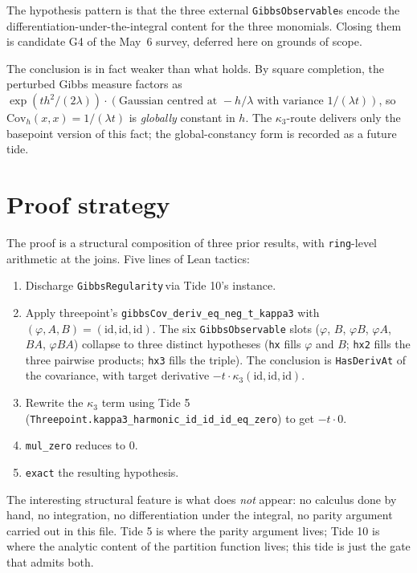 \documentclass[11pt]{article}
\begin{document}
The hypothesis pattern is that the three external \texttt{GibbsObservable}s
encode the differentiation-under-the-integral content for the three
monomials. Closing them is candidate G4 of the May~6 survey, deferred
here on grounds of scope.

The conclusion is in fact weaker than what holds. By square completion,
the perturbed Gibbs measure factors as
$\exp(t h^2/(2\lambda)) \cdot (\text{Gaussian centred at }-h/\lambda
\text{ with variance } 1/(\lambda t))$, so $\mathrm{Cov}_h(x, x) = 1/(\lambda
t)$ is \emph{globally} constant in $h$. The $\kappa_3$-route delivers
only the basepoint version of this fact; the global-constancy form is
recorded as a future tide.

\section{Proof strategy}

The proof is a structural composition of three prior results, with
\texttt{ring}-level arithmetic at the joins. Five lines of Lean tactics:

\begin{enumerate}[leftmargin=*]
\item Discharge \texttt{GibbsRegularity}\,via Tide 10's instance.
\item Apply threepoint's \texttt{gibbsCov\_deriv\_eq\_neg\_t\_kappa3}
with $(\varphi, A, B) = (\mathrm{id}, \mathrm{id}, \mathrm{id})$. The six
\texttt{GibbsObservable} slots ($\varphi$, $B$, $\varphi B$, $\varphi A$, $BA$,
$\varphi BA$) collapse to three distinct hypotheses (\texttt{hx} fills
$\varphi$ and $B$; \texttt{hx2} fills the three pairwise products; \texttt{hx3}
fills the triple). The conclusion is\linebreak
\texttt{HasDerivAt} of the covariance, with target derivative
$-t \cdot \kappa_3(\mathrm{id}, \mathrm{id}, \mathrm{id})$.
\item Rewrite the $\kappa_3$ term using Tide 5
(\texttt{Threepoint.kappa3\_harmonic\_id\_id\_id\_eq\_zero}) to get
$-t \cdot 0$.
\item \texttt{mul\_zero} reduces to $0$.
\item \texttt{exact} the resulting hypothesis.
\end{enumerate}

The interesting structural feature is what does \emph{not} appear: no
calculus done by hand, no integration, no differentiation under the
integral, no parity argument carried out in this file. Tide 5 is
where the parity argument lives; Tide 10 is where the analytic
content of the partition function lives; this tide is just the gate
that admits both.
\end{document}
